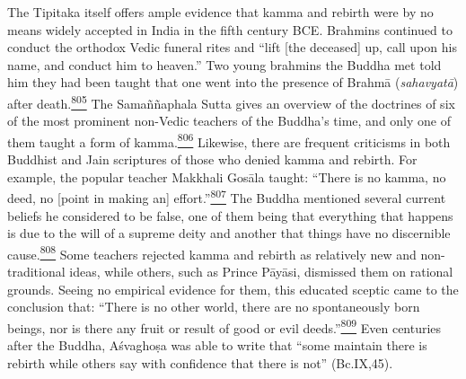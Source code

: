 The Tipitaka itself offers ample evidence that kamma and rebirth were by
no means widely accepted in India in the fifth century BCE. Brahmins
continued to conduct the orthodox Vedic funeral rites and ``lift {[}the
deceased{]} up, call upon his name, and conduct him to heaven.'' Two
young brahmins the Buddha met told him they had been taught that one
went into the presence of Brahmā (\emph{sahavyatā}) after
death.\label{footprints_split_020.html_fnref805}\hyperref[footprints_split_025.htmlux5cux23fn805]{\textsuperscript{805}}
The Samaññaphala Sutta gives an overview of the doctrines of six of the
most prominent non-Vedic teachers of the Buddha's time, and only one of
them taught a form of
kamma.\label{footprints_split_020.html_fnref806}\hyperref[footprints_split_025.htmlux5cux23fn806]{\textsuperscript{806}}
Likewise, there are frequent criticisms in both Buddhist and Jain
scriptures of those who denied kamma and rebirth. For example, the
popular teacher Makkhali Gosāla taught: ``There is no kamma, no deed, no
{[}point in making an{]}
effort.''\label{footprints_split_020.html_fnref807}\hyperref[footprints_split_025.htmlux5cux23fn807]{\textsuperscript{807}}
The Buddha mentioned several current beliefs he considered to be false,
one of them being that everything that happens is due to the will of a
supreme deity and another that things have no discernible
cause.\label{footprints_split_020.html_fnref808}\hyperref[footprints_split_025.htmlux5cux23fn808]{\textsuperscript{808}}
Some teachers rejected kamma and rebirth as relatively new and
non-traditional ideas, while others, such as Prince Pāyāsi, dismissed
them on rational grounds. Seeing no empirical evidence for them, this
educated sceptic came to the conclusion that: ``There is no other world,
there are no spontaneously born beings, nor is there any fruit or result
of good or evil
deeds.''\label{footprints_split_020.html_fnref809}\hyperref[footprints_split_025.htmlux5cux23fn809]{\textsuperscript{809}}
Even centuries after the Buddha, Aśvaghoṣa was able to write that ``some
maintain there is rebirth while others say with confidence that there is
not'' (Bc.IX,45).

